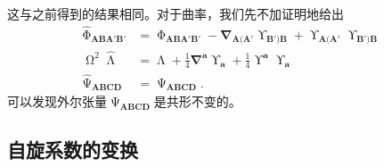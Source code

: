 这与之前得到的结果相同。对于曲率，我们先不加证明地给出
\begin{equation*}
	\begin{aligned}
		\hat{\upPhi }_{\boldsymbol{ABA} '\boldsymbol{B} '} & =\upPhi _{\boldsymbol{ABA} '\boldsymbol{B} '} -\boldsymbol{\nabla }_{\boldsymbol{A}(\boldsymbol{A} '} \upUpsilon _{\boldsymbol{B} ')\boldsymbol{B}} +\upUpsilon _{\boldsymbol{A}(\boldsymbol{A} '} \upUpsilon _{\boldsymbol{B} ')\boldsymbol{B}}\\
		\upOmega^{2}\hat{\upLambda } & =\upLambda +\frac{1}{4}\boldsymbol{\nabla }^{\boldsymbol{a}} \upUpsilon _{\boldsymbol{a}} +\frac{1}{4} \upUpsilon ^{\boldsymbol{a}} \upUpsilon _{\boldsymbol{a}}\\
		\hat{\upPsi }_{\boldsymbol{ABCD}} & =\upPsi _{\boldsymbol{ABCD}} .
	\end{aligned}
\end{equation*}
可以发现外尔张量$\upPsi _{\boldsymbol{ABCD}}$是共形不变的。


\subsection{自旋系数的变换}

